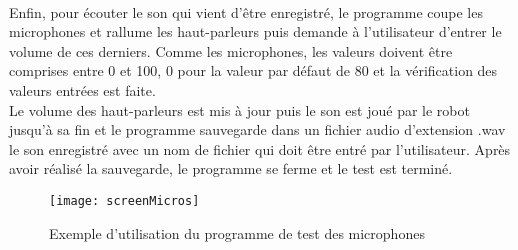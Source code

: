 \documentclass[11pt]{article} %
\begin{document}
 \\
Enfin, pour écouter le son qui vient d’être enregistré, le programme coupe les microphones et rallume les haut-parleurs puis demande à l’utilisateur d’entrer le volume de ces derniers. Comme les microphones, les valeurs doivent être comprises entre 0 et 100, 0 pour la valeur par défaut de 80 et la vérification des valeurs entrées est faite.\\
Le volume des haut-parleurs est mis à jour puis le son est joué par le robot jusqu’à sa fin et le programme sauvegarde dans un fichier audio d’extension .wav le son enregistré avec un nom de fichier qui doit être entré par l’utilisateur.
Après avoir réalisé la sauvegarde, le programme se ferme et le test est terminé.
\begin{figure}[H]
\caption{Exemple d'utilisation du programme de test des microphones}
\texttt{[image: screenMicros]}
\end{figure}
\end{document}
